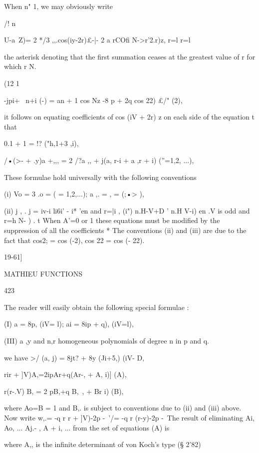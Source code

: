 {{When n"  1, we may obviously write 

/! n 

U-a\ Z)= 2 */3 ,,.cos(iy-2r)£-|- 2 a  rCOfi N->r'2.r)z, 
r=l r=l 

the asterisk denoting that the first summation ceases at the greatest value of r for which 
r N. 

 (12 1 

-jpi+ \  n+i (-) = an + 1 cos Nz -8 p + 2q cos 22) £/"  (2), 

it follows on equating coefficients of cos (iV  + 2r) z on each side of the equation t that 

0.1 + 1 =  !? ("h,1+3 ,i), 

/•(>- + .y)a +,,, = 2 /?a ,, + j(a, r-i + a ,r + i)  (''=1,2, ...), 

These formulae hold universally with the following conventions %

(i) Vo = 3 .o = (  = 1,2,...); a ,. =  ,   = (;•> ), 

(ii)  j ,  . j =   iv-i   li6i' -  i*   'en and r=|i , 
(i")  n.H-V+D ' n.H V-i)  en .V is odd and r=h N- ) . 
t When A'=0 or 1 these equations must be modified by the suppression of all the coefficients 
* The conventions (ii) and (iii) are due to the fact that cos2; = cos (-2), cos 22 = cos (- 22). 



19-61] 



MATHIEU FUNCTIONS 



423 



The reader will easily obtain the following special formulae : 

(I) a  = 8p, (iV= l); ai = 8ip + q), (iV=l), 

(III) a ,y and  n,r    homogeneous polynomials of degree n in p and q. 

we have >/ (a, j) = 8jt? + 8y (Ji+5,) (iV- D, 

rir + ]V)A,=2ipAr+q(Ar-, + A, i)] (A), 

r(r-.V) B, = 2 pB,+q  B,\ , + Br i)  (B), 

where Ao=B  = 1 and B,. is subject to conventions due to (ii) and (iii) above. 
Now write w,.= -q  r  r + ]V)-2p -\  '/= -q  r (r-y)-2p -\ 
The result of eliminating Ai, Ao, ... Aj.- , A  + i, ... from the set of equations (A) is 

where A,, is the infinite determinant of von Koch's type (§ 2'82) 

}}
